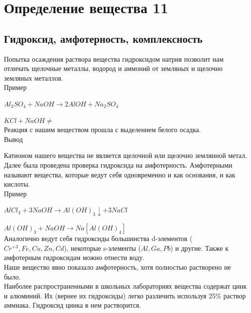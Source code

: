 \documentclass[a4paper,14pt,titlepage,twoside]{article}
\begin{document}
    \section{Определение вещества 11}
        \subsection{Гидроксид, амфотерность, комплексность}
            Попытка осаждения раствора вещества гидроксидом натрия позволит 
            нам отличать щелочные металлы, водород и аммоний от земляных 
            и щелочно земляных металлов.\\

            Пример
            \par$Al_2SO_4 +NaOH \to 2AlOH + Na_2SO_4$
            \par$KCl + NaOH \ne$\\

            Реакция с нашим веществом прошла с выделением белого осадка.\\

            Вывод 

            Катионом нашего вещества не является щелочной или щелочно землянной
            метал.\\
            
            Далее была проведена проверка гидроксида на амфотерность.
            Амфотерными называют вещества, которые ведут себя одновременно 
            и как основания, и как кислоты.\\

            Пример
            \par$AlCl_3 + 3NaOH \to Al(OH)_3 \downarrow + 3NaCl$
            \par$Al(OH)_3 + NaOH \to Na[Al(OH)_4]$\\

            Аналогично ведут себя гидроксиды большинства d-элементов ($Cr^{+3}, Fe,
            Cu, Zn, Cd$), некоторые s-элементы ($Al, Ga, Pb$) и другие. Также к
            амфотерным гидроксидам можно отнести воду.\\

            Наше вещество явно показало амфотерность, хотя полностью растворено 
            не было.\\

            Наиболее распространенными в школьных лабораториях вещества содержат 
            цинк и алюминий. Их (вернее их гидроксиды) легко различить используя
            25\% раствор аммиака. Гидроксид цинка в нем растворится.\\
\end{document}

